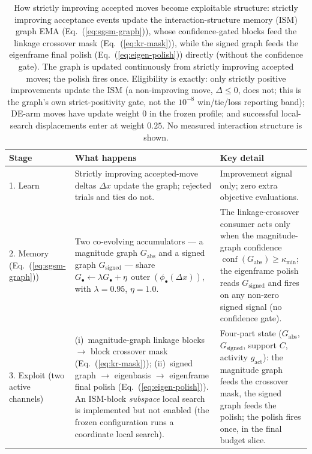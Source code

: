 \begin{table}[t]
\caption{How strictly improving accepted moves become exploitable structure:
strictly improving acceptance events update the interaction-structure
memory (ISM) graph EMA (Eq.~(\ref{eq:sgsm-graph})), whose confidence-gated
blocks feed the linkage crossover mask (Eq.~(\ref{eq:kr-mask})), while the
signed graph feeds the eigenframe final polish (Eq.~(\ref{eq:eigen-polish}))
directly (without the confidence gate).
The graph is updated continuously from strictly improving accepted moves; the
polish fires once. Eligibility is exactly: only strictly positive improvements
update the ISM (a non-improving move, $\Delta \le 0$, does not; this is the
graph's own strict-positivity gate, not the $10^{-8}$ win/tie/loss reporting
band); DE-arm moves have update weight $0$ in the frozen profile; and
successful local-search displacements enter at weight $0.25$.
No measured interaction structure is shown.}
\label{tab:sgsm-mechanism}
\centering
\footnotesize
\begin{tabular}{p{2.4cm}p{7.6cm}p{3.7cm}}
\toprule
\textbf{Stage} & \textbf{What happens} & \textbf{Key detail} \\
\midrule
1. Learn & Strictly improving accepted-move deltas $\Delta x$ update the graph; rejected trials and ties do not. & Improvement signal only; zero extra objective evaluations. \\
2. Memory (Eq.~(\ref{eq:sgsm-graph})) & Two co-evolving accumulators --- a magnitude graph $G_{\mathrm{abs}}$ and a signed graph $G_{\mathrm{signed}}$ --- share $G_\bullet \gets \lambda G_\bullet + \eta\,\operatorname{outer}(\phi_\bullet(\Delta x))$, with $\lambda{=}0.95$, $\eta{=}1.0$. & The linkage-crossover consumer acts only when the magnitude-graph confidence $\operatorname{conf}(G_{\mathrm{abs}})\ge\kappa_{\min}$; the eigenframe polish reads $G_{\mathrm{signed}}$ and fires on any non-zero signed signal (no confidence gate). \\
3. Exploit (two active channels) & (i)~magnitude-graph linkage blocks $\to$ block crossover mask (Eq.~(\ref{eq:kr-mask})); (ii)~signed graph $\to$ eigenbasis $\to$ eigenframe final polish (Eq.~(\ref{eq:eigen-polish})). An ISM-block \emph{subspace} local search is implemented but not enabled (the frozen configuration runs a coordinate local search). & Four-part state ($G_{\mathrm{abs}}$, $G_{\mathrm{signed}}$, support $C$, activity $g_{\mathrm{act}}$): the magnitude graph feeds the crossover mask, the signed graph feeds the polish; the polish fires once, in the final budget slice. \\
\bottomrule
\end{tabular}
\end{table}

